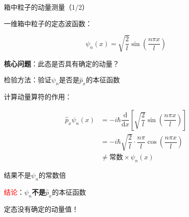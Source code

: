 
\begin{frame}{箱中粒子的动量测量（1/2）}
    \begin{iqbitemize}
    \item 一维箱中粒子的定态波函数：
    \end{iqbitemize}
      \[
        \psi_n(x) = \sqrt{\dfrac{2}{l}}\sin\left(\dfrac{n\pi x}{l}\right)
      \]
    \begin{iqbitemize}
    \item \textbf{核心问题}：此态是否具有确定的动量？
    \item 检验方法：验证$\psi_n$是否是$\hat{p}_x$的本征函数
    \end{iqbitemize}
    \iqbsmallsep

    \begin{iqbitemize}
    \item 计算动量算符的作用：
    \end{iqbitemize}
      \[
        \begin{aligned}
          \hat{p}_x\psi_n(x) &= -i\hbar\dfrac{\mathrm{d}}{\mathrm{d}x}\left[\sqrt{\dfrac{2}{l}}\sin\left(\dfrac{n\pi x}{l}\right)\right] \\
          &= -i\hbar\sqrt{\dfrac{2}{l}} \cdot \dfrac{n\pi}{l}\cos\left(\dfrac{n\pi x}{l}\right) \\
          &\neq \text{常数} \times \psi_n(x)
        \end{aligned}
      \]
    \begin{iqbitemize}
    \item 结果不是$\psi_n$的常数倍
    \item \textcolor{red}{结论}：$\psi_n$\textbf{不是}$\hat{p}_x$的本征函数
    \item 定态没有确定的动量值！
    \end{iqbitemize}
  
\end{frame}

